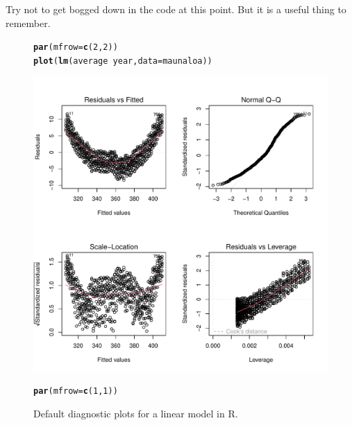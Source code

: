 \documentclass{tufte-handout}\usepackage[]{graphicx}\usepackage[]{xcolor}
\makeatletter
\def\maxwidth{ %
  \ifdim\Gin@nat@width>\linewidth
    \linewidth
  \else
    \Gin@nat@width
  \fi
}
\newcommand{\hlnum}[1]{\textcolor[rgb]{0.686,0.059,0.569}{#1}}%
\newcommand{\hlopt}[1]{\textcolor[rgb]{0,0,0}{#1}}%
\newcommand{\hlstd}[1]{\textcolor[rgb]{0.345,0.345,0.345}{#1}}%
\newcommand{\hlkwc}[1]{\textcolor[rgb]{0.333,0.667,0.333}{#1}}%
\newcommand{\hlkwd}[1]{\textcolor[rgb]{0.737,0.353,0.396}{\textbf{#1}}}%
\newenvironment{kframe}{%
 \def\at@end@of@kframe{}%
 \ifinner\ifhmode%
  \def\at@end@of@kframe{\end{minipage}}%
  \begin{minipage}{\columnwidth}%
 \fi\fi%
 \def\FrameCommand##1{\hskip\@totalleftmargin \hskip-\fboxsep
 \colorbox{shadecolor}{##1}\hskip-\fboxsep
     \hskip-\linewidth \hskip-\@totalleftmargin \hskip\columnwidth}%
 \MakeFramed {\advance\hsize-\width
   \@totalleftmargin\z@ \linewidth\hsize
   \@setminipage}}%
 {\par\unskip\endMakeFramed%
 \at@end@of@kframe}
\newenvironment{knitrout}{}{} %
\makeatother
\begin{document}
Try not to get bogged down in the code at this point. But it is a useful thing to remember.

\begin{figure}
\label{fig:diagnostics}
\caption{Default diagnostic plots for a linear model in R.}
\begin{knitrout}
\color{fgcolor}\begin{kframe}
\begin{alltt}
\hlkwd{par}\hlstd{(}\hlkwc{mfrow}\hlstd{=}\hlkwd{c}\hlstd{(}\hlnum{2}\hlstd{,}\hlnum{2}\hlstd{))}
\hlkwd{plot}\hlstd{(}\hlkwd{lm}\hlstd{(average} \hlopt{~} \hlstd{year,} \hlkwc{data}\hlstd{=maunaloa))}
\end{alltt}
\end{kframe}
\includegraphics[width=\maxwidth]{figure/unnamed-chunk-57-1} 
\begin{kframe}\begin{alltt}
\hlkwd{par}\hlstd{(}\hlkwc{mfrow}\hlstd{=}\hlkwd{c}\hlstd{(}\hlnum{1}\hlstd{,}\hlnum{1}\hlstd{))}
\end{alltt}
\end{kframe}
\end{knitrout}
\end{figure}
\end{document}
